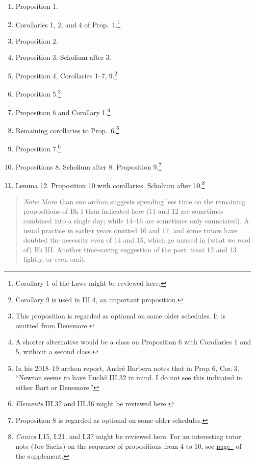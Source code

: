\documentclass[10pt]{article}
\begin{document}
\begin{enumerate}[resume*] \item Proposition 1.  \item
		Corollaries 1, 2, and 4 of
		Prop.~1.\footnote{Corollary 1 of the Laws
			might be reviewed here.} \item
		Proposition 2.  \item Proposition 3.
		Scholium after 3.  \item Proposition 4.
		Corollaries 1--7, 9.\footnote{Corollary 9 is used in III.4, an important proposition.}  \item Proposition
		5.\footnote{This proposition is regarded as
			optional on some older schedules. It is omitted from Densmore.}
	\item Proposition 6 and Corollary 1.\footnote{A
			shorter alternative would be
			a class on Proposition 6 with Corollaries 1 and
			5, without a second class.}  \item
		Remaining corollaries to Prop.~6.\footnote{In his 2018--19 archon report, Andr\'e Barbera notes that in Prop.\,6, Cor.\,3, ``Newton seems to have Euclid III.32 in mind. I do not see
		this indicated in either Bart or Densmore.''}
		  \item
		Proposition 7.\footnote{\emph{Elements}
			III.32 and III.36 might be reviewed
			here.} \item Propositions 8.
		Scholium after 8. Proposition
		9.\footnote{Proposition 8 is regarded as
			optional on some older schedules.}
	\item Lemma 12. Proposition 10 with corollaries.
		Scholium after 10.\footnote{\emph{Conics}
			I.15, I.21, and I.37 might be
			reviewed here. For an interesting
			tutor note (Joe Sachs) on the
			sequence of propositions from 4 to
			10, see
			\hyperref[supple.77]{page~\pageref{supple.77}}
			of the supplement.} \end{enumerate}
			\vspace{-0.5em}
\begin{quote} \small{\emph{Note}: More than one archon
		suggests spending less time on the remaining
		propositions of Bk I than indicated here (11
		and 12 are sometimes combined into a single
		day; while 14–16 are sometimes only
		enunciated). A usual practice in earlier
		years omitted 16 and 17, and some tutors
		have doubted the necessity even of 14 and
		15, which go unused in (what we read of) Bk
		III. Another time-saving suggestion of the
		past: treat 12 and 13 lightly, or even
		omit.}  \end{quote}
\end{document}
